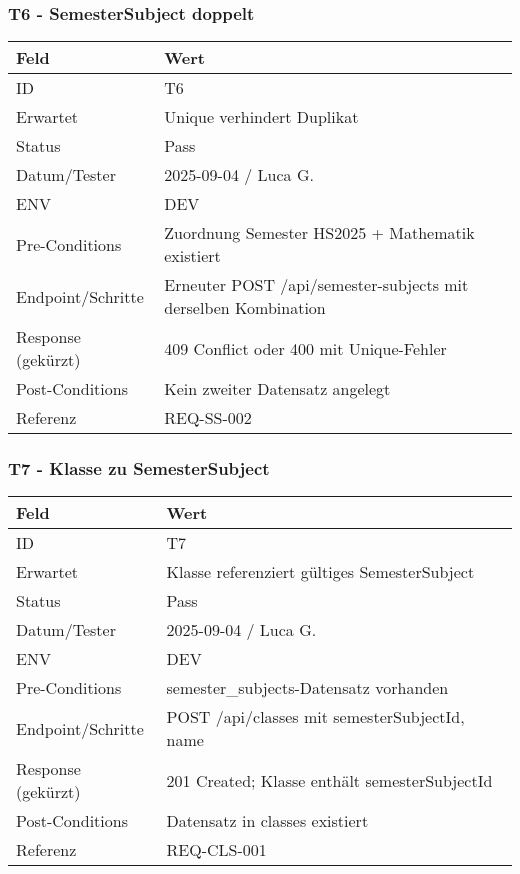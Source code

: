 \documentclass[12pt,a4paper]{article}
\begin{document}
    \subsubsection{T6 - SemesterSubject doppelt}
    {\small
        \begin{tabularx}{\textwidth}{|p{3.2cm}|X|}
            \hline
            \textbf{Feld} & \textbf{Wert} \\ \hline
            ID & T6 \\ \hline
            Erwartet & Unique verhindert Duplikat \\ \hline
            Status & Pass \\ \hline
            Datum/Tester & 2025-09-04 / Luca G. \\ \hline
            ENV & DEV \\ \hline
            Pre-Conditions & Zuordnung Semester HS2025 + Mathematik existiert \\ \hline
            Endpoint/Schritte & Erneuter POST /api/semester-subjects mit derselben Kombination \\ \hline
            Response (gekürzt) & 409 Conflict oder 400 mit Unique-Fehler \\ \hline
            Post-Conditions & Kein zweiter Datensatz angelegt \\ \hline
            Referenz & REQ-SS-002 \\ \hline
        \end{tabularx}
    }

    \subsubsection{T7 - Klasse zu SemesterSubject}
    {\small
        \begin{tabularx}{\textwidth}{|p{3.2cm}|X|}
            \hline
            \textbf{Feld} & \textbf{Wert} \\ \hline
            ID & T7 \\ \hline
            Erwartet & Klasse referenziert gültiges SemesterSubject \\ \hline
            Status & Pass \\ \hline
            Datum/Tester & 2025-09-04 / Luca G. \\ \hline
            ENV & DEV \\ \hline
            Pre-Conditions & semester_subjects-Datensatz vorhanden \\ \hline
            Endpoint/Schritte & POST /api/classes mit {semesterSubjectId, name} \\ \hline
            Response (gekürzt) & 201 Created; Klasse enthält semesterSubjectId \\ \hline
            Post-Conditions & Datensatz in classes existiert \\ \hline
            Referenz & REQ-CLS-001 \\ \hline
        \end{tabularx}
    }
\end{document}
